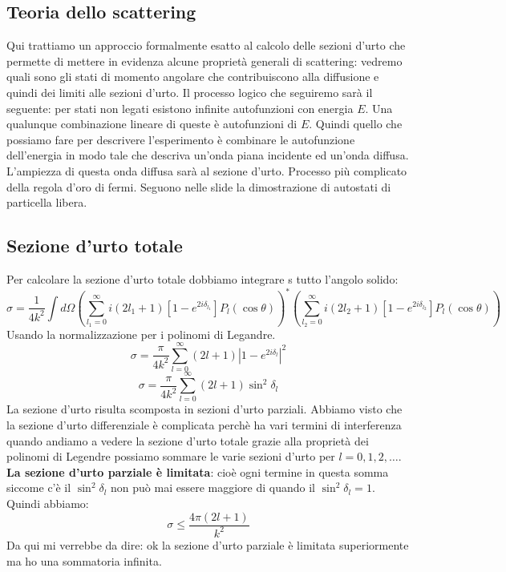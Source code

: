 \subsection{Teoria dello scattering}
Qui trattiamo un approccio formalmente esatto al calcolo delle sezioni d'urto che permette di mettere in evidenza alcune proprietà generali di scattering: vedremo quali sono gli stati di momento angolare che contribuiscono alla diffusione e quindi dei limiti alle sezioni d'urto. Il processo logico che seguiremo sarà il seguente: per stati non legati esistono infinite autofunzioni con energia $E$. Una qualunque combinazione lineare di queste è autofunzioni di $E$. Quindi quello che possiamo fare per descrivere l'esperimento è combinare le autofunzione dell'energia in modo tale che descriva un'onda piana incidente ed un'onda diffusa. L'ampiezza di questa onda diffusa sarà al sezione d'urto. Processo più complicato della regola d'oro di fermi. Seguono nelle slide la dimostrazione di autostati di particella libera. 
\subsection{Sezione d'urto totale}
Per calcolare la sezione d'urto totale dobbiamo integrare s tutto l'angolo solido:
\begin{equation*}
    \sigma=\frac{1}{4k^2}\int d\Omega \left(\sum_{l_1=0}^{\infty}i(2l_1+1)\left[1-e^{2i\delta_{l_1}}\right]P_l(\cos{\theta})\right)^*\left(\sum_{l_2=0}^{\infty}i(2l_2+1)\left[1-e^{2i\delta_{l_2}}\right]P_l(\cos{\theta})\right)
\end{equation*}
Usando la normalizzazione per i polinomi di Legandre.
\begin{equation*}
    \sigma=\frac{\pi}{4k^2}\sum_{l=0}^{\infty}(2l+1)\left|1-e^{2i\delta_l}\right|^2
\end{equation*}
\begin{equation*}
    \sigma=\frac{\pi}{4k^2}\sum_{l=0}^{\infty}(2l+1)\sin^2{\delta_l}
\end{equation*}
La sezione d'urto risulta scomposta in sezioni d'urto parziali. Abbiamo visto che la sezione d'urto differenziale è complicata perchè ha vari termini di interferenza quando andiamo a vedere la sezione d'urto totale grazie alla proprietà dei polinomi di Legendre possiamo sommare le varie sezioni d'urto per $l = 0,1,2,\ldots$. \textbf{La sezione d'urto parziale è limitata}: cioè ogni termine in questa somma siccome c'è il $\sin^2{\delta_l}$ non può mai essere maggiore di quando il $\sin^2{\delta_l}=1$. Quindi abbiamo:
\begin{equation*}
    \sigma\le\frac{4\pi(2l+1)}{k^2}
\end{equation*}
Da qui mi verrebbe da dire: ok la sezione d'urto parziale è limitata superiormente ma ho una sommatoria infinita.
